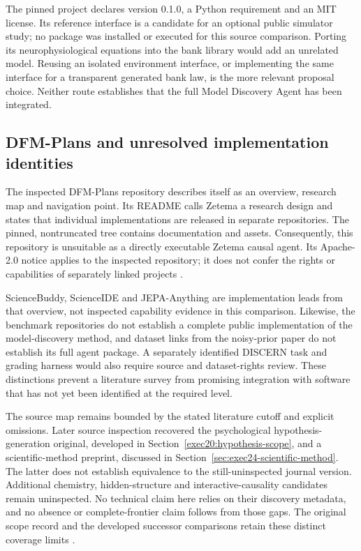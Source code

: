 The pinned project declares version 0.1.0, a Python requirement and an MIT
license. Its reference interface is a candidate for an optional public
simulator study; no package was installed or executed for this source
comparison. Porting its neurophysiological equations into the bank library
would add an unrelated model. Reusing an isolated environment interface, or
implementing the same interface for a transparent generated bank law, is the
more relevant proposal choice. Neither route establishes that the full
Model Discovery Agent has been integrated.

\subsection{DFM-Plans and unresolved implementation identities}

The inspected DFM-Plans repository describes itself as an overview, research
map and navigation point. Its README calls Zetema a research design and
states that individual implementations are released in separate repositories.
The pinned, nontruncated tree contains documentation and assets. Consequently,
this repository is unsuitable as a directly executable Zetema causal agent.
Its Apache-2.0 notice applies to the inspected repository; it does not confer
the rights or capabilities of separately linked projects
\citep{exec13_active_dfmplans}.

ScienceBuddy, ScienceIDE and JEPA-Anything are implementation leads from that
overview, not inspected capability evidence in this comparison. Likewise,
the benchmark repositories do not establish a complete public implementation
of the model-discovery method, and dataset links from the noisy-prior paper
do not establish its full agent package. A separately identified DISCERN
task and grading harness would also require source and dataset-rights review.
These distinctions prevent a literature survey from promising integration
with software that has not yet been identified at the required level.

The source map remains bounded by the stated literature cutoff and explicit
omissions. Later source inspection recovered the psychological
hypothesis-generation original, developed in
Section~\ref{exec20:hypothesis-scope}, and a scientific-method preprint,
discussed in Section~\ref{sec:exec24-scientific-method}. The latter does not
establish equivalence to the still-uninspected journal version. Additional
chemistry, hidden-structure and interactive-causality candidates remain
uninspected. No technical claim here relies on their discovery metadata, and
no absence or complete-frontier claim follows from those gaps. The original
scope record and the developed successor comparisons retain these distinct
coverage limits
\citep{exec13_active_scope}.

